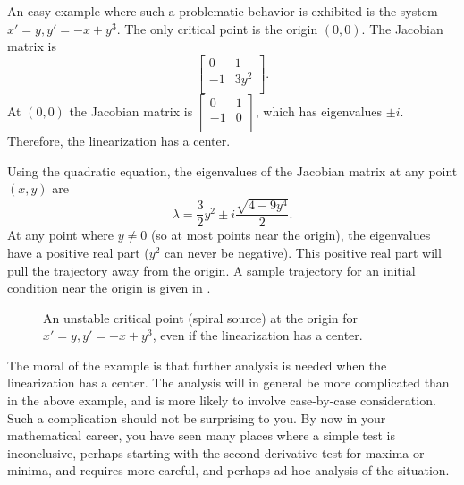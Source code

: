\begin{example}
An easy example where such a problematic behavior is exhibited is the system
$x'=y, y' = -x+y^3$.  The only critical point
is the origin $(0,0)$.  The Jacobian matrix is 
\begin{equation*}
\begin{bmatrix}
0 & 1 \\
-1 & 3 y^2 \\
\end{bmatrix} .
\end{equation*}
At 
$(0,0)$ the Jacobian matrix is
$\left[ \begin{smallmatrix}
0 & 1 \\
-1 & 0 \\
\end{smallmatrix} \right]$, which has eigenvalues $\pm i$.  Therefore, the
linearization has a center.

Using the quadratic equation, the eigenvalues of the
Jacobian matrix at any point $(x,y)$ are
\begin{equation*}
\lambda = 
\frac{3}{2}y^2 \pm
i
\frac{\sqrt{4-9y^4}}{2} .
\end{equation*}
At any point where $y \not= 0$ (so at most points near the origin), the eigenvalues have a positive real part ($y^2$ can
never be negative).  This positive real part 
will pull the trajectory away from the origin.  A sample trajectory for an
initial condition near the origin is given in
.
\begin{figure}[h!t]
\capstart
\begin{center}
\caption{An unstable critical point (spiral source) at the origin
for $x'=y, y' = -x+y^3$, even if the linearization has a center.  \label{fig:nlin-unstable-center}}
\end{center}
\end{figure}
\end{example}

The moral of the example is that further analysis is needed when the
linearization has a center.  The analysis will in general be more
complicated than in the above example, and is more likely to involve
case-by-case consideration.  Such a complication should not be
surprising to you.  By now in your mathematical career, you have
seen many places where a simple test is inconclusive, perhaps starting with
the second derivative test for maxima or minima, and requires more careful,
and perhaps ad hoc analysis of the situation.

